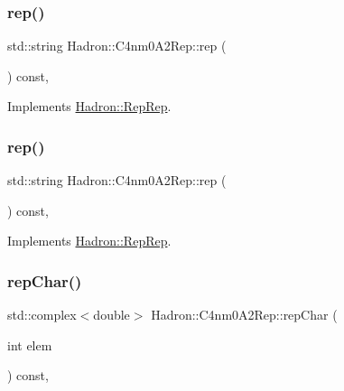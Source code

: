 \subsubsection{\texorpdfstring{rep()}{rep()}\hspace{0.1cm}{\footnotesize\ttfamily [2/3]}}
{\footnotesize\ttfamily std\+::string Hadron\+::\+C4nm0\+A2\+Rep\+::rep (\begin{DoxyParamCaption}{ }\end{DoxyParamCaption}) const\hspace{0.3cm}{\ttfamily [inline]}, {\ttfamily [virtual]}}



Implements \mbox{\hyperlink{structHadron_1_1RepRep_ab3213025f6de249f7095892109575fde}{Hadron\+::\+Rep\+Rep}}.

\mbox{\label{structHadron_1_1C4nm0A2Rep_a33fdf55c4518f4e03005b1fc05271695}} 
\subsubsection{\texorpdfstring{rep()}{rep()}\hspace{0.1cm}{\footnotesize\ttfamily [3/3]}}
{\footnotesize\ttfamily std\+::string Hadron\+::\+C4nm0\+A2\+Rep\+::rep (\begin{DoxyParamCaption}{ }\end{DoxyParamCaption}) const\hspace{0.3cm}{\ttfamily [inline]}, {\ttfamily [virtual]}}



Implements \mbox{\hyperlink{structHadron_1_1RepRep_ab3213025f6de249f7095892109575fde}{Hadron\+::\+Rep\+Rep}}.

\mbox{\label{structHadron_1_1C4nm0A2Rep_ad4d1ed2c8ee991654f7c1369f487a810}} 
\subsubsection{\texorpdfstring{repChar()}{repChar()}\hspace{0.1cm}{\footnotesize\ttfamily [1/2]}}
{\footnotesize\ttfamily std\+::complex$<$double$>$ Hadron\+::\+C4nm0\+A2\+Rep\+::rep\+Char (\begin{DoxyParamCaption}\item[{int}]{elem }\end{DoxyParamCaption}) const\hspace{0.3cm}{\ttfamily [inline]}, {\ttfamily [virtual]}}



